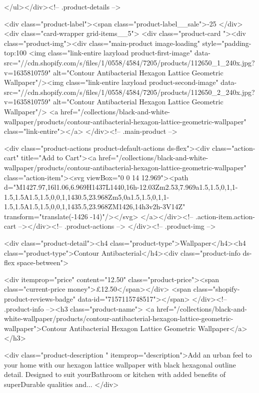 {{{{{{{      </ul></div><!-- .product-details -->

<div class="product-label"><span class="product-label__sale">-25%
          </div><div class="card-wrapper grid-items__5">
            <div class="product-card "><div class="product-img"><div class="main-product image-loading" style="padding-top:100%
      <img class="link-entire lazyload product-first-image" data-src="//cdn.shopify.com/s/files/1/0558/4584/7205/products/112650_1_240x.jpg?v=1635810759" alt="Contour Antibacterial Hexagon Lattice Geometric Wallpaper"/><img class="link-entire lazyload product-second-image" data-src="//cdn.shopify.com/s/files/1/0558/4584/7205/products/112650_2_240x.jpg?v=1635810759" alt="Contour Antibacterial Hexagon Lattice Geometric Wallpaper"/>
      <a href="/collections/black-and-white-wallpaper/products/contour-antibacterial-hexagon-lattice-geometric-wallpaper" class="link-entire"></a>
    </div><!-- .main-product -->
  
<div class="product-actions product-default-actions ds-flex"><div class="action-cart" title="Add to Cart"><a href="/collections/black-and-white-wallpaper/products/contour-antibacterial-hexagon-lattice-geometric-wallpaper" class="action-item"><svg viewBox="0 0 14 12.969"><path d="M1427.97,16l1.06,6.969H1437L1440,16h-12.03Zm2.53,7.969a1.5,1.5,0,1,1-1.5,1.5A1.5,1.5,0,0,1,1430.5,23.968Zm5,0a1.5,1.5,0,1,1-1.5,1.5A1.5,1.5,0,0,1,1435.5,23.968ZM1426,14h3v2h-3V14Z" transform="translate(-1426 -14)"/></svg>
</a></div><!-- .action-item.action-cart --></div><!-- .product-actions -->
</div><!-- .product-img -->

<div class="product-detail"><h4 class="product-type">Wallpaper</h4><h4 class="product-type">Contour Antibacterial</h4><div class="product-info ds-flex space-between">
    
<div itemprop="price" content="12.50" class="product-price"><span class="current-price money">£12.50</span></div>
    <span class="shopify-product-reviews-badge" data-id="7157115748517"></span>
  </div><!-- .product-info --><h3 class="product-name">
      <a href="/collections/black-and-white-wallpaper/products/contour-antibacterial-hexagon-lattice-geometric-wallpaper">Contour Antibacterial Hexagon Lattice Geometric Wallpaper</a>
    </h3>
    
<div class="product-description " itemprop="description">Add an urban feel to your home with our hexagon lattice wallpaper with black hexagonal outline detail. Designed to suit yourBathroom or kitchen with added benefits of superDurable qualities and...
</div>



}}}}}}}
